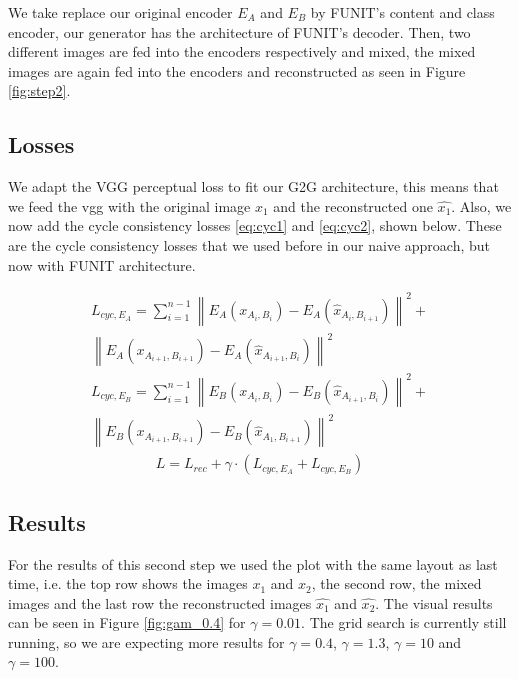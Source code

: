 \documentclass{article}
\begin{document}
\begin{multicols}{2}
We take replace our original encoder $E_A$ and $E_B$ by FUNIT's content and class encoder, our generator has the architecture of FUNIT's decoder. Then, two different images are fed into the encoders respectively and mixed, the mixed images are again fed into the encoders and reconstructed as seen in Figure \ref{fig:step2}.

\subsection{Losses}

We adapt the VGG perceptual loss to fit our G2G architecture, this means that we feed the vgg with the original image $x_1$ and the reconstructed one $\hat{x_1}$. Also, we now add the cycle consistency losses \ref{eq:cyc1} and \ref{eq:cyc2}, shown below. These are the cycle consistency losses that we used before in our naive approach, but now with FUNIT architecture.

\begin{multline}
	L_{cyc,E_A} = \sum_{i=1}^{n-1} \left\| E_A(x_{A_i,B_i})- E_A(\hat{x}_{A_i,B_{i+1}})\right\| ^2+ 
	\\
	\left\| E_A(x_{A_{i+1},B_{i+1}}) - E_A(\hat{x}_{A_{i+1},B_i})\right\|^2
	\label{eq:cyc1}
\end{multline}
\begin{multline}
	L_{cyc,E_B} = \sum_{i=1}^{n-1} \left\| E_B(x_{A_i,B_i}) - E_B(\hat{x}_{A_{i+1},B_i})\right\| ^2+ 
	\\
	\left\| E_B(x_{A_{i+1},B_{i+1}}) - E_B(\hat{x}_{A_1,B_{i+1}})\right\|^2
	\label{eq:cyc2}
\end{multline}
\begin{multline}
	L = L_{rec} + \gamma \cdot (L_{cyc,E_A} + L_{cyc,E_B})
	\label{eq:all}
\end{multline}

\subsection{Results}

For the results of this second step we used the plot with the same layout as last time, i.e. the top row shows the images $x_1$ and $x_2$, the second row, the mixed images and the last row the reconstructed images $\hat{x_1}$ and $\hat{x_2}$. The visual results can be seen in Figure \ref{fig:gam_0.4} for $\gamma = 0.01$. The grid search is currently still running, so we are expecting more results for $\gamma = 0.4$, $\gamma = 1.3$, $\gamma = 10$ and $\gamma = 100$.


\end{multicols}
\end{document}
